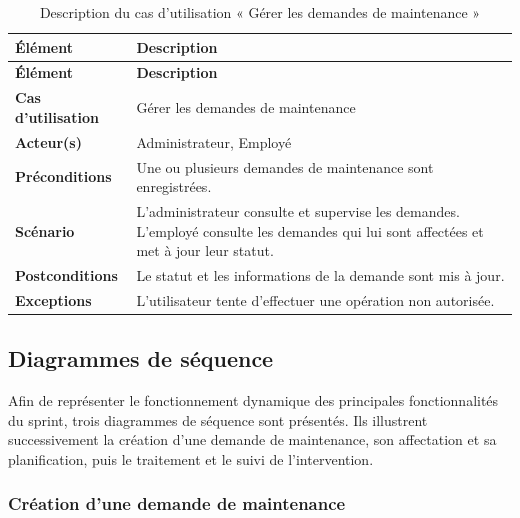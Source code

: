 \begin{longtable}{|>{\RaggedRight\arraybackslash}p{4cm}|>{\RaggedRight\arraybackslash}p{10.5cm}|}

\caption{Description du cas d'utilisation « Gérer les demandes de maintenance »}
\label{tab:uc6-maintenance-requests}\\

\hline
\textbf{Élément} & \textbf{Description} \\
\hline
\endfirsthead

\hline
\textbf{Élément} & \textbf{Description} \\
\hline
\endhead

\textbf{Cas d'utilisation} &
Gérer les demandes de maintenance \\
\hline

\textbf{Acteur(s)} &
Administrateur, Employé \\
\hline

\textbf{Préconditions} &
Une ou plusieurs demandes de maintenance sont enregistrées. \\
\hline

\textbf{Scénario} &
L'administrateur consulte et supervise les demandes. L'employé consulte les demandes qui lui sont affectées et met à jour leur statut. \\
\hline

\textbf{Postconditions} &
Le statut et les informations de la demande sont mis à jour. \\
\hline

\textbf{Exceptions} &
L'utilisateur tente d'effectuer une opération non autorisée. \\
\hline

\end{longtable}

\subsection{Diagrammes de séquence}

Afin de représenter le fonctionnement dynamique des principales fonctionnalités du sprint, trois diagrammes de séquence sont présentés. Ils illustrent successivement la création d'une demande de maintenance, son affectation et sa planification, puis le traitement et le suivi de l'intervention.

\subsubsection{Création d'une demande de maintenance}

